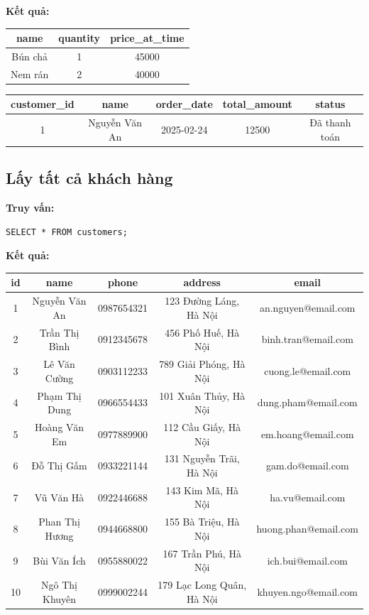 \documentclass{article}
\begin{document}
\textbf{Kết quả:}

\begin{longtable}{|c|c|c|}
\hline
name & quantity & price\_at\_time \\
\hline
Bún chả & 1 & 45000 \\
Nem rán & 2 & 40000 \\
\hline
\end{longtable}

\begin{longtable}{|c|c|c|c|c|}
\hline
customer\_id & name & order\_date & total\_amount & status \\
\hline
1 & Nguyễn Văn An & 2025-02-24 & 12500 & Đã thanh toán \\
\hline
\end{longtable}

\subsection{Lấy tất cả khách hàng}

\textbf{Truy vấn:}

\begin{verbatim}
SELECT * FROM customers;
\end{verbatim}

\textbf{Kết quả:}
\begin{longtable}{|c|c|c|c|c|}
\hline
id & name & phone & address & email \\
\hline
1 & Nguyễn Văn An & 0987654321 & 123 Đường Láng, Hà Nội & an.nguyen@email.com \\
2 & Trần Thị Bình & 0912345678 & 456 Phố Huế, Hà Nội & binh.tran@email.com \\
3 & Lê Văn Cường & 0903112233 & 789 Giải Phóng, Hà Nội & cuong.le@email.com \\
4 & Phạm Thị Dung & 0966554433 & 101 Xuân Thủy, Hà Nội & dung.pham@email.com \\
5 & Hoàng Văn Em & 0977889900 & 112 Cầu Giấy, Hà Nội & em.hoang@email.com \\
6 & Đỗ Thị Gấm & 0933221144 & 131 Nguyễn Trãi, Hà Nội & gam.do@email.com \\
7 & Vũ Văn Hà & 0922446688 & 143 Kim Mã, Hà Nội & ha.vu@email.com \\
8 & Phan Thị Hương & 0944668800 & 155 Bà Triệu, Hà Nội & huong.phan@email.com \\
9 & Bùi Văn Ích & 0955880022 & 167 Trần Phú, Hà Nội & ich.bui@email.com \\
10 & Ngô Thị Khuyên & 0999002244 & 179 Lạc Long Quân, Hà Nội & khuyen.ngo@email.com \\
\hline
\end{longtable}
\end{document}
